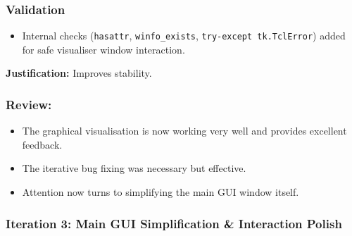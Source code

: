 \subsubsection{Validation}
\begin{itemize}
	\item Internal checks (\verb|hasattr|, \verb|winfo_exists|, \verb|try-except tk.TclError|) added for safe visualiser window interaction.
\end{itemize}
\textbf{Justification:} Improves stability.

\subsubsection{Review:}
\begin{itemize}
	\item The graphical visualisation is now working very well and provides excellent feedback.
	\item The iterative bug fixing was necessary but effective.
	\item Attention now turns to simplifying the main GUI window itself.
\end{itemize}

\newpage

\subsubsection{Iteration 3: Main GUI Simplification \& Interaction Polish}

